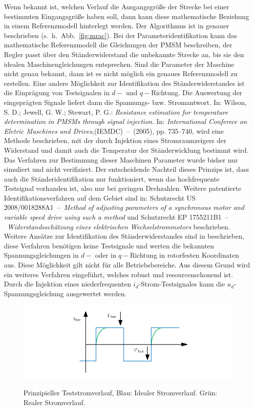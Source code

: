 \documentclass[conference,twocolumn]{IEEEtran}
\begin{document}
Wenn bekannt ist, welchen Verlauf die Ausgangsgröße der Strecke bei einer bestimmten Eingangsgröße haben soll, dann kann diese mathematische Beziehung in einem Referenzmodell hinterlegt werden.
Der Algorithmus ist in \autocite{slotine_applied_1991} genauer beschrieben (s.~h.~Abb.~\ref{fig:mrac}).
Bei der Parameteridentifikation kann das mathematische Referenzmodell die Gleichungen der PMSM beschreiben, der Regler passt über den Ständerwiderstand die unbekannte Strecke an, bis sie den idealen Maschinengleichungen entsprechen.
Sind die Parameter der Maschine nicht genau bekannt, dann ist es nicht möglich ein genaues Referenzmodell zu erstellen.
Eine andere Möglichkeit zur Identifikation des Ständerwiderstandes ist die Einprägung von Testsignalen in $d-$ und $q-$Richtung.
Die Auswertung der eingeprägten Signale liefert dann die Spannungs- bzw. Stromantwort.
In: Wilson, S. D.; Jewell, G. W.; Stewart, P. G.: \emph{Resistance estimation for temperature determination in PMSMs through signal injection}. In: \emph{International Conferece on Eletric Maschines and Drives},(IEMDC)~--~(2005), pp. 735--740, wird eine Methode beschrieben, mit der durch Injektion eines Stromraumzeigers der Widerstand und damit auch die Temperatur der Ständerwicklung bestimmt wird.
Das Verfahren zur Bestimmung dieser Maschinen Parameter wurde bisher nur simuliert und nicht verifiziert.
Der entscheidende Nachteil dieses Prinzips ist, dass auch die Ständeridentifikation nur funktioniert, wenn das hochfrequente Testsignal vorhanden ist, also nur bei geringen Drehzahlen.
Weitere patentierte Identifikationsverfahren auf dem Gebiet sind in: Schutzrecht US 2008/0018288A1~--~\emph{Method of adjusting parameters
of a synchronous motor and variable speed drive using such a method} und Schutzrecht EP 1755211B1~--~\emph{Widerstandsschätzung eines elektrischen
Wechselstrommotors} beschrieben.
Weitere Ansätze zur Identifikation des Ständerwiderstandes sind in \textcite{Kellner2012} beschrieben, diese Verfahren benötigen keine Testsignale und werten die bekannten Spannungsgleichungen in $d-$ oder in $q-$Richtung in rotorfesten Koordinaten aus.
Diese Möglichkeit gilt nicht für alle Betriebsbereiche. 
Aus diesem Grund wird ein weiteres Verfahren eingeführt, welches robust und resourcenschonend ist.
Durch die Injektion eines niederfrequenten $i_d$-Strom-Testsignales kann die $u_d$-Spannungsgleichung ausgewertet werden.

\begin{figure}
\includegraphics[width=\columnwidth]{img/test-strom}
\label{fig:test-strom}
\caption{Prinzipieller Teststromverlauf, Blau: Idealer Stromverlauf. Grün: Realer Stromverlauf.}
\end{figure}
\end{document}
